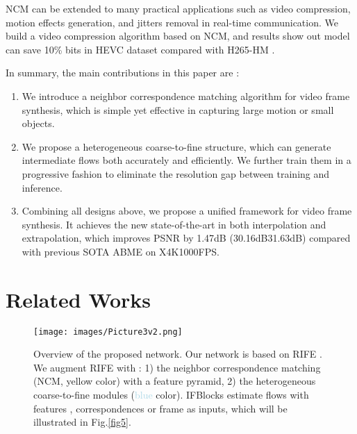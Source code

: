 \documentclass[sigconf]{acmart}
\begin{document}
NCM can be extended to many practical applications such as video compression, motion effects generation, and jitters removal in real-time communication. We build a video compression algorithm based on NCM, and results show out model can save 10\% bits in HEVC dataset compared with H265-HM \cite{HM}.

In summary, the main contributions in this paper are : 
\begin{enumerate}
\item We introduce a neighbor correspondence matching algorithm for video frame synthesis, which is simple yet effective in capturing large motion or small objects.
\item We propose a heterogeneous coarse-to-fine structure, which can generate intermediate flows both accurately and efficiently. We further train them in a progressive fashion to eliminate the resolution gap between training and inference.
\item Combining all designs above, we propose a unified framework for video frame synthesis. It achieves the new state-of-the-art in both interpolation and extrapolation, which improves PSNR by 1.47dB (30.16dB31.63dB) compared with previous SOTA ABME
\cite{park2021asymmetric} on X4K1000FPS.
\end{enumerate}




\section{Related Works}
\label{sec:rela}


\begin{figure*}
    \texttt{[image: images/Picture3v2.png]}
    \caption{Overview of the proposed network. Our network is based on RIFE \cite{huang2020rife}. We augment RIFE with : 1) the neighbor correspondence matching (NCM, \textcolor{lightgold}{yellow} color) with a feature pyramid, 2) the heterogeneous coarse-to-fine modules (\textcolor{lightblue}{blue} color). IFBlocks estimate flows with features , correspondences  or frame  as inputs, which will be illustrated in Fig.\ref{fig5}. }
    \label{fig3}
\end{figure*}
\end{document}
